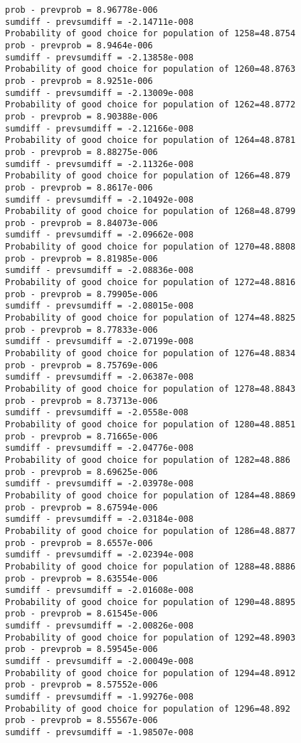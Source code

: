 \documentclass[11pt,onecolumn]{article}
\begin{document}
\begin{verbatim}
prob - prevprob = 8.96778e-006
sumdiff - prevsumdiff = -2.14711e-008
Probability of good choice for population of 1258=48.8754
prob - prevprob = 8.9464e-006
sumdiff - prevsumdiff = -2.13858e-008
Probability of good choice for population of 1260=48.8763
prob - prevprob = 8.9251e-006
sumdiff - prevsumdiff = -2.13009e-008
Probability of good choice for population of 1262=48.8772
prob - prevprob = 8.90388e-006
sumdiff - prevsumdiff = -2.12166e-008
Probability of good choice for population of 1264=48.8781
prob - prevprob = 8.88275e-006
sumdiff - prevsumdiff = -2.11326e-008
Probability of good choice for population of 1266=48.879
prob - prevprob = 8.8617e-006
sumdiff - prevsumdiff = -2.10492e-008
Probability of good choice for population of 1268=48.8799
prob - prevprob = 8.84073e-006
sumdiff - prevsumdiff = -2.09662e-008
Probability of good choice for population of 1270=48.8808
prob - prevprob = 8.81985e-006
sumdiff - prevsumdiff = -2.08836e-008
Probability of good choice for population of 1272=48.8816
prob - prevprob = 8.79905e-006
sumdiff - prevsumdiff = -2.08015e-008
Probability of good choice for population of 1274=48.8825
prob - prevprob = 8.77833e-006
sumdiff - prevsumdiff = -2.07199e-008
Probability of good choice for population of 1276=48.8834
prob - prevprob = 8.75769e-006
sumdiff - prevsumdiff = -2.06387e-008
Probability of good choice for population of 1278=48.8843
prob - prevprob = 8.73713e-006
sumdiff - prevsumdiff = -2.0558e-008
Probability of good choice for population of 1280=48.8851
prob - prevprob = 8.71665e-006
sumdiff - prevsumdiff = -2.04776e-008
Probability of good choice for population of 1282=48.886
prob - prevprob = 8.69625e-006
sumdiff - prevsumdiff = -2.03978e-008
Probability of good choice for population of 1284=48.8869
prob - prevprob = 8.67594e-006
sumdiff - prevsumdiff = -2.03184e-008
Probability of good choice for population of 1286=48.8877
prob - prevprob = 8.6557e-006
sumdiff - prevsumdiff = -2.02394e-008
Probability of good choice for population of 1288=48.8886
prob - prevprob = 8.63554e-006
sumdiff - prevsumdiff = -2.01608e-008
Probability of good choice for population of 1290=48.8895
prob - prevprob = 8.61545e-006
sumdiff - prevsumdiff = -2.00826e-008
Probability of good choice for population of 1292=48.8903
prob - prevprob = 8.59545e-006
sumdiff - prevsumdiff = -2.00049e-008
Probability of good choice for population of 1294=48.8912
prob - prevprob = 8.57552e-006
sumdiff - prevsumdiff = -1.99276e-008
Probability of good choice for population of 1296=48.892
prob - prevprob = 8.55567e-006
sumdiff - prevsumdiff = -1.98507e-008

\end{verbatim}
\end{document}
